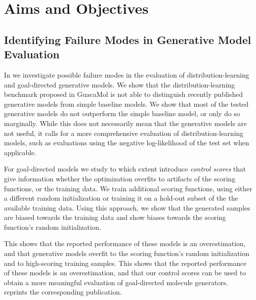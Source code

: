 \section{Aims and Objectives\label{sec:aims-objectives}}
\subsection{Identifying Failure Modes in Generative Model Evaluation}
In \citep{renzFailureModesMolecule2019} we investigate possible failure modes in the evaluation of
distribution-learning and goal-directed generative models. We show that the distribution-learning
benchmark proposed in GuacaMol \citep{brownGuacaMolBenchmarkingModels2019} is not able to
distinguish recently published generative models from simple baseline models. We show that most of
the tested generative models do not outperform the simple baseline model, or only do so marginally.
While this does not necessarily mean that the generative models are not useful, it calls for a more
comprehensive evaluation of distribution-learning models, such as evaluations using the negative
log-likelihood of the test set when applicable.

For goal-directed models we study to which extent introduce \emph{control scores} that give information whether the
optimization overfits to artifacts of the scoring functions, or the training data. We train
additional scoring functions, using either a different random initialization or training it
on a hold-out subset of the the available training data. Using this approach, we show that
the generated samples are biased towards the training data and show biases towards the
scoring function's random initialization.

This shows that the reported performance of these models is an overestimation, and
that generative models overfit to the scoring function's random initialization and to high-scoring
training samples. This shows that the reported performance of these models is an overestimation, and
that our control scores can be used to obtain a more meaningful evaluation of goal-directed molecule
generators.  reprints the corresponding publication.


